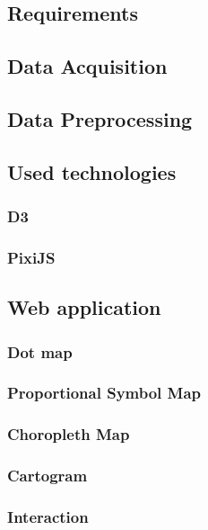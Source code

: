 \subsection{Requirements}


\subsection{Data Acquisition}


\subsection{Data Preprocessing}
\label{s:data-preprocessing}


\subsection{Used technologies}
\subsubsection{D3}
\subsubsection{PixiJS}

\subsection{Web application}

\subsubsection{Dot map}
\subsubsection{Proportional Symbol Map}
\subsubsection{Choropleth Map}
\subsubsection{Cartogram}
\subsubsection{Interaction}


